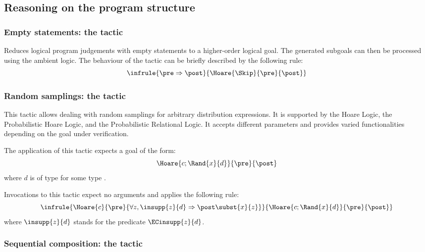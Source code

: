 

\subsection{Reasoning on the program structure}

\subsubsection*{Empty statements: the  tactic}

\Syntax {}

\Description Reduces logical program judgements with empty statements
to a higher-order logical goal. The generated subgoals can then be
processed using the ambient logic. The behaviour of the 
tactic can be briefly described by the following rule:
%
\begin{displaymath}
\infrule{
  \pre \Rightarrow \post
}{
  \Hoare{\Skip}{\pre}{\post}
}
\end{displaymath}
%


\subsubsection*{Random samplings: the  tactic}

This tactic allows dealing with random samplings for arbitrary
distribution expressions. It is supported by the Hoare Logic, the
Probabilistic Hoare Logic, and the Probabilistic Relational Logic. It
accepts different parameters and provides varied functionalities
depending on the goal under verification.

\Description

The application of this tactic expects a goal of the form:
\begin{displaymath}
  \Hoare{c;\Rand{x}{d}}{\pre}{\post}
\end{displaymath}
where $d$ is of type  for some type .

Invocations to this tactic expect no arguments and applies the
following rule:
\begin{displaymath}
\infrule{
  \Hoare{c}{\pre}{\forall z,\insupp{z}{d} \Rightarrow \post\subst{x}{z}}
}{
  \Hoare{c;\Rand{x}{d}}{\pre}{\post}
}
\end{displaymath}
where $\insupp{z}{d}$ stands for the predicate $\ECinsupp{z}{d}$.


\subsubsection*{Sequential composition: the  tactic}
%

